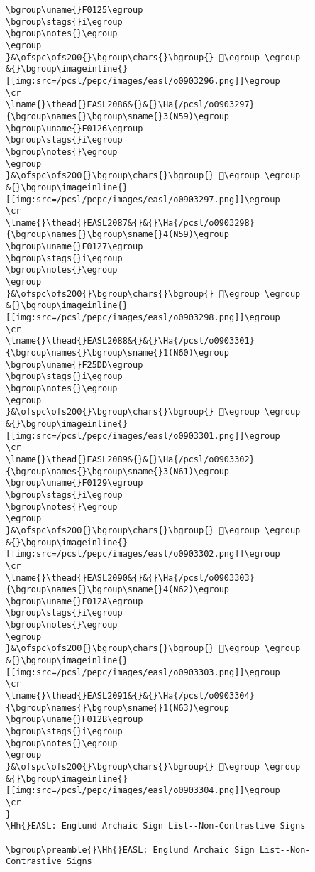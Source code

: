 \begin{verbatim}
\bgroup\uname{}F0125\egroup
\bgroup\stags{}i\egroup
\bgroup\notes{}\egroup
\egroup
}&\ofspc\ofs200{}\bgroup\chars{}\bgroup{} 󰄥\egroup \egroup
&{}\bgroup\imageinline{}[[img:src=/pcsl/pepc/images/easl/o0903296.png]]\egroup
\cr
\lname{}\thead{}EASL2086&{}&{}\Ha{/pcsl/o0903297}{\bgroup\names{}\bgroup\sname{}3(N59)\egroup
\bgroup\uname{}F0126\egroup
\bgroup\stags{}i\egroup
\bgroup\notes{}\egroup
\egroup
}&\ofspc\ofs200{}\bgroup\chars{}\bgroup{} 󰄦\egroup \egroup
&{}\bgroup\imageinline{}[[img:src=/pcsl/pepc/images/easl/o0903297.png]]\egroup
\cr
\lname{}\thead{}EASL2087&{}&{}\Ha{/pcsl/o0903298}{\bgroup\names{}\bgroup\sname{}4(N59)\egroup
\bgroup\uname{}F0127\egroup
\bgroup\stags{}i\egroup
\bgroup\notes{}\egroup
\egroup
}&\ofspc\ofs200{}\bgroup\chars{}\bgroup{} 󰄧\egroup \egroup
&{}\bgroup\imageinline{}[[img:src=/pcsl/pepc/images/easl/o0903298.png]]\egroup
\cr
\lname{}\thead{}EASL2088&{}&{}\Ha{/pcsl/o0903301}{\bgroup\names{}\bgroup\sname{}1(N60)\egroup
\bgroup\uname{}F25DD\egroup
\bgroup\stags{}i\egroup
\bgroup\notes{}\egroup
\egroup
}&\ofspc\ofs200{}\bgroup\chars{}\bgroup{} 󲗝\egroup \egroup
&{}\bgroup\imageinline{}[[img:src=/pcsl/pepc/images/easl/o0903301.png]]\egroup
\cr
\lname{}\thead{}EASL2089&{}&{}\Ha{/pcsl/o0903302}{\bgroup\names{}\bgroup\sname{}3(N61)\egroup
\bgroup\uname{}F0129\egroup
\bgroup\stags{}i\egroup
\bgroup\notes{}\egroup
\egroup
}&\ofspc\ofs200{}\bgroup\chars{}\bgroup{} 󰄩\egroup \egroup
&{}\bgroup\imageinline{}[[img:src=/pcsl/pepc/images/easl/o0903302.png]]\egroup
\cr
\lname{}\thead{}EASL2090&{}&{}\Ha{/pcsl/o0903303}{\bgroup\names{}\bgroup\sname{}4(N62)\egroup
\bgroup\uname{}F012A\egroup
\bgroup\stags{}i\egroup
\bgroup\notes{}\egroup
\egroup
}&\ofspc\ofs200{}\bgroup\chars{}\bgroup{} 󰄪\egroup \egroup
&{}\bgroup\imageinline{}[[img:src=/pcsl/pepc/images/easl/o0903303.png]]\egroup
\cr
\lname{}\thead{}EASL2091&{}&{}\Ha{/pcsl/o0903304}{\bgroup\names{}\bgroup\sname{}1(N63)\egroup
\bgroup\uname{}F012B\egroup
\bgroup\stags{}i\egroup
\bgroup\notes{}\egroup
\egroup
}&\ofspc\ofs200{}\bgroup\chars{}\bgroup{} 󰄫\egroup \egroup
&{}\bgroup\imageinline{}[[img:src=/pcsl/pepc/images/easl/o0903304.png]]\egroup
\cr
}
\Hh{}EASL: Englund Archaic Sign List--Non-Contrastive Signs

\bgroup\preamble{}\Hh{}EASL: Englund Archaic Sign List--Non-Contrastive Signs


\end{verbatim}
